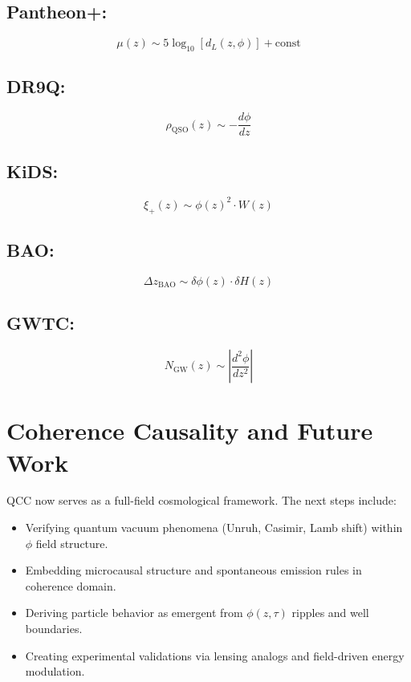 \documentclass[11pt]{article}
\begin{document}
\subsection*{Pantheon+:}
\[
\mu(z) \sim 5 \log_{10} \left[d_L(z, \phi)\right] + \text{const}
\]

\subsection*{DR9Q:}
\[
\rho_{\text{QSO}}(z) \sim -\frac{d\phi}{dz}
\]

\subsection*{KiDS:}
\[
\xi_+(z) \sim \phi(z)^2 \cdot W(z)
\]

\subsection*{BAO:}
\[
\Delta z_{\text{BAO}} \sim \delta\phi(z) \cdot \delta H(z)
\]

\subsection*{GWTC:}
\[
N_{\text{GW}}(z) \sim \left|\frac{d^2\phi}{dz^2}\right|
\]

\section{Coherence Causality and Future Work}

QCC now serves as a full-field cosmological framework. The next steps include:
\begin{itemize}
    \item Verifying quantum vacuum phenomena (Unruh, Casimir, Lamb shift) within $\phi$ field structure.
    \item Embedding microcausal structure and spontaneous emission rules in coherence domain.
    \item Deriving particle behavior as emergent from $\phi(z, \tau)$ ripples and well boundaries.
    \item Creating experimental validations via lensing analogs and field-driven energy modulation.
\end{itemize}
\end{document}
